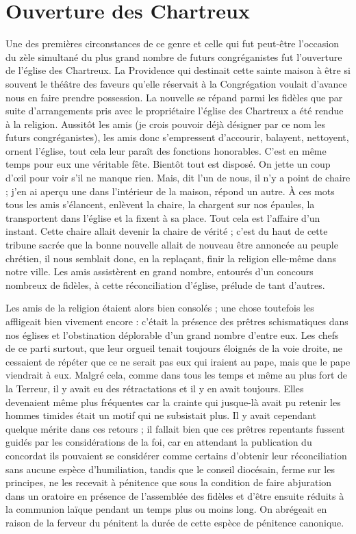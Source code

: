 \section*{Ouverture des Chartreux}
Une des premières circonstances de ce genre et celle qui fut peut-être l’occasion du zèle simultané du plus grand nombre de futurs congréganistes fut l'ouverture de l'église des Chartreux. La Providence qui destinait cette sainte maison à être si souvent le théâtre des faveurs qu'elle réservait à la Congrégation voulait d'avance nous en faire prendre possession. La nouvelle se répand parmi les fidèles que par suite d'arrangements pris avec le propriétaire l'église des Chartreux a été rendue à la religion. Aussitôt les amis (je crois pouvoir déjà désigner par ce nom les futurs congréganistes), les amis donc s'empressent d'accourir, balayent, nettoyent, ornent l'église, tout cela leur paraît des fonctions honorables. C'est en même temps pour eux une véritable fête. Bientôt tout est disposé. On jette un coup d'œil pour voir s'il ne manque rien. Mais, dit l'un de nous, il n'y a point de chaire ; j'en ai aperçu une dans l'intérieur de la maison, répond un autre. À ces mots tous les amis s'élancent, enlèvent la chaire, la chargent sur nos épaules, la transportent dans l'église et la fixent à sa place. Tout cela
est l'affaire d'un instant. Cette chaire allait devenir la chaire de vérité ; c’est du haut de cette tribune sacrée que la bonne nouvelle allait de nouveau être annoncée au peuple chrétien, il nous semblait donc, en la replaçant, finir la religion elle-même dans notre ville. Les amis assistèrent en grand nombre, entourés d'un concours nombreux de fidèles, à cette réconciliation d'église, prélude de tant d'autres.

Les amis de la religion étaient alors bien consolés ; une chose toutefois les affligeait bien vivement encore : c'était la présence des prêtres schismatiques dans nos églises et l'obstination déplorable d'un grand nombre d'entre eux. Les chefs de ce parti surtout, que leur orgueil tenait toujours éloignés de la voie droite, ne cessaient de répéter que ce ne serait pas eux qui iraient au pape, mais que le pape viendrait à eux. Malgré cela, comme dans tous les temps et même au plus fort de la Terreur, il y avait eu des rétractations et il y en avait toujours. Elles devenaient même plus fréquentes car la crainte qui jusque-là avait pu retenir les hommes timides était un motif qui ne subsistait plus. Il y avait cependant quelque mérite dans ces retours ; il fallait bien que ces prêtres repentants fussent guidés par les considérations de la foi, car en attendant la publication du concordat ils pouvaient se considérer comme certains d'obtenir leur réconciliation sans aucune espèce d'humiliation, tandis que le conseil diocésain, ferme sur les principes, ne les recevait à pénitence que sous la condition de faire abjuration dans un oratoire en présence de
l'assemblée des fidèles et d'être ensuite réduits à la communion laïque pendant un temps plus ou moins long. On abrégeait en raison de la ferveur du pénitent la durée de cette espèce de pénitence canonique.

